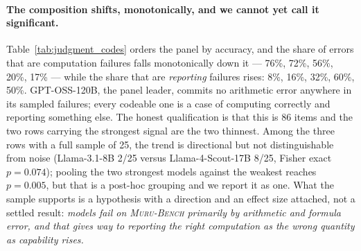 \documentclass{article}
\newcommand{\muru}{\textsc{Muru-Bench}}
\begin{document}
\begin{table}[t]
\centering
\caption{Judgment coding of the balanced sample: one primary code per error, grouped. \textbf{Computation} is C1--C5 (wrong formula, wrong direction, arithmetic slip); \textbf{reporting} is R1--R5 (the computation is right and the reported number is not the answer); \textbf{no computation} is a result asserted without one (A1, XX); \textbf{item defect} is a failure of our own stem rather than of the model. The last column is a Wilson 95\% interval on the reporting share. The two strongest rows rest on 6 and 5 errors, because those models make almost none.}
\label{tab:judgment_codes}
\end{table}

\paragraph{The composition shifts, monotonically, and we cannot yet call it significant.} Table~\ref{tab:judgment_codes} orders the panel by accuracy, and the share of errors that are computation failures falls monotonically down it --- 76\%, 72\%, 56\%, 20\%, 17\% --- while the share that are \emph{reporting} failures rises: 8\%, 16\%, 32\%, 60\%, 50\%. GPT-OSS-120B, the panel leader, commits no arithmetic error anywhere in its sampled failures; every codeable one is a case of computing correctly and reporting something else. The honest qualification is that this is 86 items and the two rows carrying the strongest signal are the two thinnest. Among the three rows with a full sample of 25, the trend is directional but not distinguishable from noise (Llama-3.1-8B 2/25 versus Llama-4-Scout-17B 8/25, Fisher exact $p = 0.074$); pooling the two strongest models against the weakest reaches $p = 0.005$, but that is a post-hoc grouping and we report it as one. What the sample supports is a hypothesis with a direction and an effect size attached, not a settled result: \emph{models fail on \muru{} primarily by arithmetic and formula error, and that gives way to reporting the right computation as the wrong quantity as capability rises.}
\end{document}
